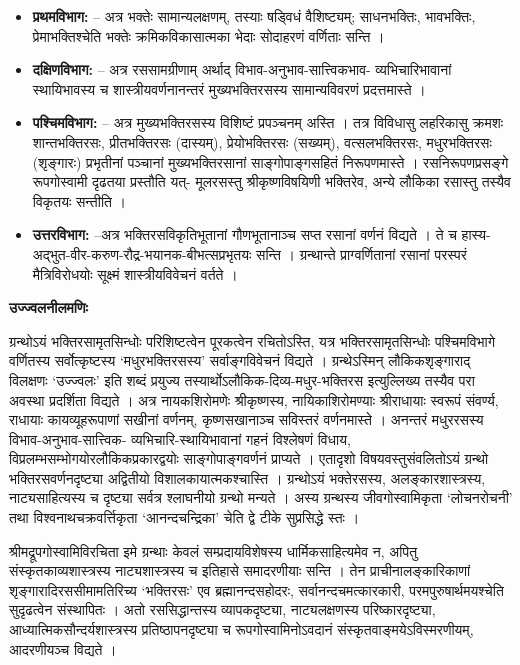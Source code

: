 \documentclass[10pt, a5paper, twoside]{article}
\newcommand{\customparagraph}[1]{
    \noindent \textbf{#1} \par
    \penalty 10000 %
    \vspace{0.1cm plus 0.05cm minus 0.02cm}
    \penalty 10000 %
}
\begin{document}
\begin{itemize}
\item \textbf{प्रथमविभाग:} – अत्र भक्तेः सामान्यलक्षणम्, तस्याः षड्विधं वैशिष्ट्यम्; साधनभक्तिः, भावभक्तिः, प्रेमाभक्तिश्चेति भक्तेः क्रमिकविकासात्मका भेदाः सोदाहरणं वर्णिताः सन्ति ।


\item \textbf{दक्षिणविभाग:} – अत्र रससामग्रीणाम् अर्थाद् विभाव-अनुभाव-सात्त्विकभाव- व्यभिचारिभावानां स्थायिभावस्य च शास्त्रीयवर्णनानन्तरं मुख्यभक्तिरसस्य सामान्यविवरणं प्रदत्तमास्ते ।


\item \textbf{पश्चिमविभाग:} – अत्र मुख्यभक्तिरसस्य विशिष्टं प्रपञ्चनम् अस्ति । तत्र विविधासु लहरिकासु क्रमशः शान्तभक्तिरसः, प्रीतभक्तिरसः (दास्यम्), प्रेयोभक्तिरसः (सख्यम्), वत्सलभक्तिरसः, मधुरभक्तिरसः (शृङ्गारः) प्रभृतीनां पञ्चानां मुख्यभक्तिरसानां साङ्गोपाङ्गसहितं निरूपणमास्ते । रसनिरूपणप्रसङ्गे रूपगोस्वामी दृढतया प्रस्तौति यत्- मूलरसस्तु श्रीकृष्णविषयिणी भक्तिरेव, अन्ये लौकिका रसास्तु तस्यैव विकृतयः सन्तीति ।


\item \textbf{उत्तरविभाग:} –अत्र भक्तिरसविकृतिभूतानां गौणभूतानाञ्च सप्त रसानां वर्णनं विद्यते । ते च हास्य-अद्भुत-वीर-करुण-रौद्र-भयानक-बीभत्सप्रभृतयः सन्ति । ग्रन्थान्ते प्राग्वर्णितानां रसानां परस्परं मैत्रिविरोधयोः सूक्ष्मं शास्त्रीयविवेचनं वर्तते ।


\end{itemize}
\customparagraph{\textbf{उज्ज्वलनीलमणिः}}

ग्रन्थोऽयं भक्तिरसामृतसिन्धोः परिशिष्टत्वेन पूरकत्वेन रचितोऽस्ति, यत्र भक्तिरसामृतसिन्धोः पश्चिमविभागे वर्णितस्य सर्वोत्कृष्टस्य `मधुरभक्तिरसस्य' सर्वाङ्गविवेचनं विद्यते । ग्रन्थेऽस्मिन् लौकिकशृङ्गाराद् विलक्षणः `उज्ज्वलः' इति शब्दं प्रयुज्य तस्यार्थोऽलौकिक-दिव्य-मधुर-भक्तिरस इत्युल्लिख्य तस्यैव परा अवस्था प्रदर्शिता विद्यते । अत्र नायकशिरोमणेः श्रीकृष्णस्य, नायिकाशिरोमण्याः श्रीराधायाः स्वरूपं संवर्ण्य, राधायाः कायव्यूहरूपाणां सखीनां वर्णनम्, कृष्णसखानाञ्च सविस्तरं वर्णनमास्ते । अनन्तरं मधुररसस्य विभाव-अनुभाव-सात्त्विक- व्यभिचारि-स्थायिभावानां गहनं विश्लेषणं विधाय, विप्रलम्भसम्भोगयोरलौकिकप्रकारद्वयोः साङ्गोपाङ्गवर्णनं प्राप्यते । एतादृशो विषयवस्तुसंवलितोऽयं ग्रन्थो भक्तिरसवर्णनदृष्ट्या अद्वितीयो विशालकायात्मकश्चास्ति । ग्रन्थोऽयं भक्तेरसस्य, अलङ्कारशास्त्रस्य, नाट्यसाहित्यस्य च दृष्ट्या सर्वत्र श्लाघनीयो ग्रन्थो मन्यते । अस्य ग्रन्थस्य जीवगोस्वामिकृता `लोचनरोचनी' तथा विश्वनाथचक्रवर्त्तिकृता `आनन्दचन्द्रिका' चेति द्वे टीके सुप्रसिद्धे स्तः ।

श्रीमद्रूपगोस्वामिविरचिता इमे ग्रन्थाः केवलं सम्प्रदायविशेषस्य धार्मिकसाहित्यमेव न, अपितु संस्कृतकाव्यशास्त्रस्य नाट्यशास्त्रस्य च इतिहासे समादरणीयाः सन्ति । तेन प्राचीनालङ्कारिकाणां शृङ्गारादिरससीमामतिरिच्य `भक्तिरसः' एव ब्रह्मानन्दसहोदरः, सर्वानन्दचमत्कारकारी, परमपुरुषार्थमयश्चेति सुदृढत्वेन संस्थापितः । अतो रससिद्धान्तस्य व्यापकदृष्ट्या, नाट्यलक्षणस्य परिष्कारदृष्ट्या, आध्यात्मिकसौन्दर्यशास्त्रस्य प्रतिष्ठापनदृष्ट्या च रूपगोस्वामिनोऽवदानं संस्कृतवाङ्मयेऽविस्मरणीयम्, आदरणीयञ्च विद्यते ।
\end{document}
